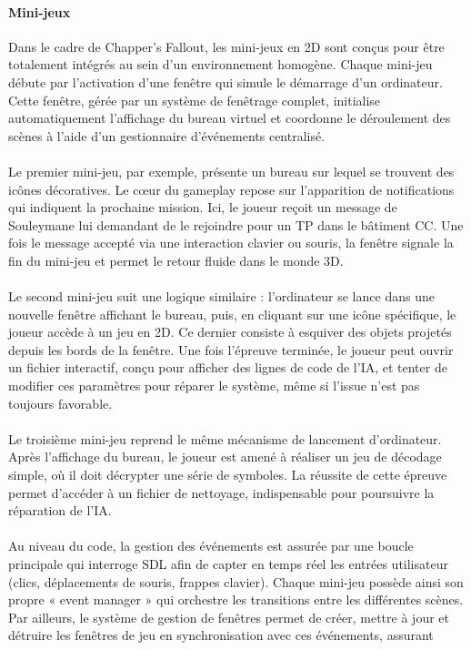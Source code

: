 \paragraph{Mini-jeux}
Dans le cadre de Chapper's Fallout, les mini-jeux en 2D sont conçus pour être totalement intégrés au sein d’un environnement homogène. Chaque mini-jeu débute 
par l’activation d’une fenêtre qui simule le démarrage d’un ordinateur. Cette fenêtre, gérée par un système de fenêtrage complet, initialise automatiquement 
l’affichage du bureau virtuel et coordonne le déroulement des scènes à l’aide d’un gestionnaire d’événements centralisé.
\\ \\
Le premier mini-jeu, par exemple, présente un bureau sur lequel se trouvent des icônes décoratives. Le cœur du gameplay repose sur l’apparition de 
notifications qui indiquent la prochaine mission. Ici, le joueur reçoit un message de Souleymane lui demandant de le rejoindre pour un TP dans le bâtiment CC. 
Une fois le message accepté via une interaction clavier ou souris, la fenêtre signale la fin du mini-jeu et permet le retour fluide dans le monde 3D.
\\ \\
Le second mini-jeu suit une logique similaire : l’ordinateur se lance dans une nouvelle fenêtre affichant le bureau, puis, en cliquant sur une icône spécifique, 
le joueur accède à un jeu en 2D. Ce dernier consiste à esquiver des objets projetés depuis les bords de la fenêtre. Une fois l’épreuve terminée, le joueur peut 
ouvrir un fichier interactif, conçu pour afficher des lignes de code de l’IA, et tenter de modifier ces paramètres pour réparer le système, même si l’issue n’est 
pas toujours favorable.
\\ \\
Le troisième mini-jeu reprend le même mécanisme de lancement d’ordinateur. Après l’affichage du bureau, le joueur est amené à réaliser un jeu de décodage simple, 
où il doit décrypter une série de symboles. La réussite de cette épreuve permet d’accéder à un fichier de nettoyage, indispensable pour poursuivre la réparation 
de l’IA.
\\ \\
Au niveau du code, la gestion des événements est assurée par une boucle principale qui interroge SDL afin de capter en temps réel les entrées utilisateur (clics, 
déplacements de souris, frappes clavier). Chaque mini-jeu possède ainsi son propre « event manager » qui orchestre les transitions entre les différentes scènes. 
Par ailleurs, le système de gestion de fenêtres permet de créer, mettre à jour et détruire les fenêtres de jeu en synchronisation avec ces événements, assurant 
